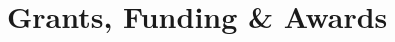 \documentclass[11pt,letterpaper,sans]{moderncv}
\begin{document}
\vspace{-3mm}
\section{Grants, Funding \& Awards}
\end{document}
